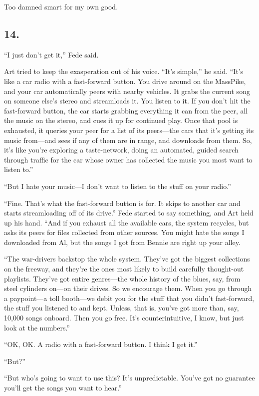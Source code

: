 Too damned smart for my own good.

\subsection{14.}

“I just don’t get it,” Fede said.

Art tried to keep the exasperation out of his voice. “It’s simple,”
he said. “It’s like a car radio with a fast-forward button. You
drive around on the MassPike, and your car automatically peers with
nearby vehicles. It grabs the current song on someone else’s stereo
and streamloads it. You listen to it. If you don’t hit the
fast-forward button, the car starts grabbing everything it can from
the peer, all the music on the stereo, and cues it up for continued
play. Once that pool is exhausted, it queries your peer for a list
of its peers—the cars that it’s getting its music from—and sees if
any of them are in range, and downloads from them. So, it’s like
you’re exploring a taste-network, doing an automated, guided search
through traffic for the car whose owner has collected the music you
most want to listen to.”

“But I hate your music—I don’t want to listen to the stuff on your
radio.”

“Fine. That’s what the fast-forward button is for. It skips to
another car and starts streamloading off of its drive.” Fede
started to say something, and Art held up his hand. “And if you
exhaust all the available cars, the system recycles, but asks its
peers for files collected from other sources. You might hate the
songs I downloaded from Al, but the songs I got from Bennie are
right up your alley.

“The war-drivers backstop the whole system. They’ve got the biggest
collections on the freeway, and they’re the ones most likely to
build carefully thought-out playlists. They’ve got entire
genres—the whole history of the blues, say, from steel cylinders
on—on their drives. So we encourage them. When you go through a
paypoint—a toll booth—we debit you for the stuff that you didn’t
fast-forward, the stuff you listened to and kept. Unless, that is,
you’ve got more than, say, 10,000 songs onboard. Then you go free.
It’s counterintuitive, I know, but just look at the numbers.”

“OK, OK. A radio with a fast-forward button. I think I get it.”

“But?”

“But who’s going to want to use this? It’s unpredictable. You’ve
got no guarantee you’ll get the songs you want to hear.”

